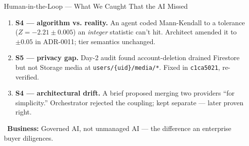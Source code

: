 \documentclass[aspectratio=169,11pt]{beamer}
\providecommand{\faChartPie}{}
\newcommand{\biz}[1]{\vspace{0.3em}\par{\footnotesize\color{moodorange}\faChartPie\ \textbf{Business:} #1}}
\begin{document}
\begin{frame}{Human-in-the-Loop --- What We Caught That the AI Missed}
  \begin{enumerate}\small
    \item \textbf{S4 --- algorithm vs. reality.} An agent coded Mann-Kendall to a tolerance ($Z=-2.21\pm0.005$) an \emph{integer} statistic can't hit. Architect amended it to $\pm0.05$ in ADR-0011; tier semantics unchanged.
    \item \textbf{S5 --- privacy gap.} Day-2 audit found account-deletion drained Firestore but not Storage media at \texttt{users/\{uid\}/media/*}. Fixed in \texttt{c1ca5021}, re-verified.
    \item \textbf{S4 --- architectural drift.} A brief proposed merging two providers ``for simplicity.'' Orchestrator rejected the coupling; kept separate --- later proven right.
  \end{enumerate}
  \biz{Governed AI, not unmanaged AI --- the difference an enterprise buyer diligences.}
\end{frame}
\end{document}
